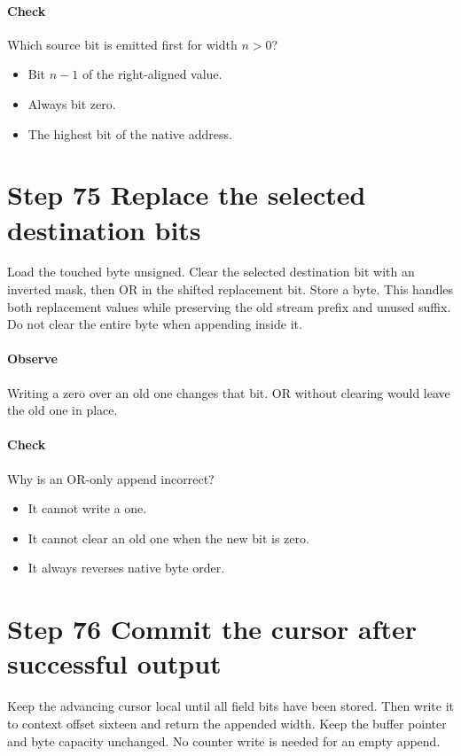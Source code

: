 \paragraph{Check} Which source bit is emitted first for width $n>0$?
\begin{itemize}
  \item[A.] Bit $n-1$ of the right-aligned value.
  \item[B.] Always bit zero.
  \item[C.] The highest bit of the native address.
\end{itemize}

\section{Step 75 Replace the selected destination bits}\label{h263-writer-s05}
Load the touched byte unsigned. Clear the selected destination bit with an
inverted mask, then OR in the shifted replacement bit. Store a byte. This handles
both replacement values while preserving the old stream prefix and unused suffix.
Do not clear the entire byte when appending inside it.

\paragraph{Observe} Writing a zero over an old one changes that bit. OR without
clearing would leave the old one in place.
\paragraph{Check} Why is an OR-only append incorrect?
\begin{itemize}
  \item[A.] It cannot write a one.
  \item[B.] It cannot clear an old one when the new bit is zero.
  \item[C.] It always reverses native byte order.
\end{itemize}

\section{Step 76 Commit the cursor after successful output}\label{h263-writer-s06}
Keep the advancing cursor local until all field bits have been stored. Then write
it to context offset sixteen and return the appended width. Keep the buffer
pointer and byte capacity unchanged. No counter write is needed for an empty
append.

